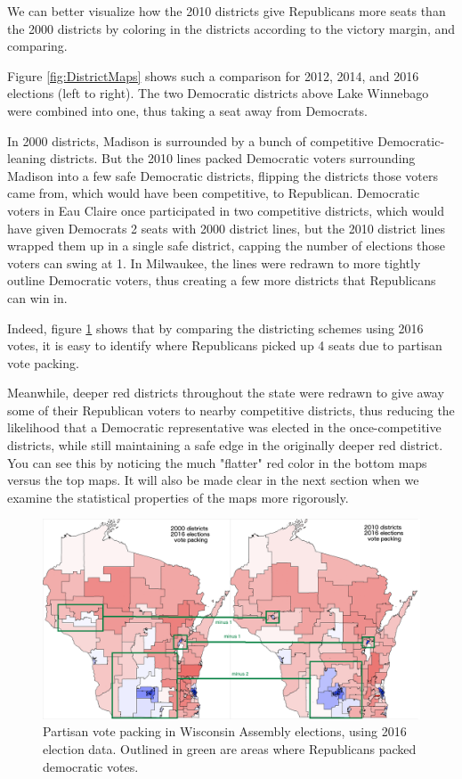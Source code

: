 \documentclass[preprint,12pt]{article}
\begin{document}
We can better visualize how the 2010 districts give Republicans more seats than the 2000 districts by coloring in the districts according to the victory margin, and comparing.

Figure \ref{fig:DistrictMaps} shows such a comparison for 2012, 2014, and 2016 elections (left to right).
The two Democratic districts above Lake Winnebago were combined into one, thus taking a seat away from Democrats.

In 2000 districts, Madison is surrounded by a bunch of competitive Democratic-leaning districts.
But the 2010 lines packed Democratic voters surrounding Madison into a few safe Democratic districts, flipping the districts those voters came from, which would have been competitive, to Republican.
Democratic voters in Eau Claire once participated in two competitive districts, which would have given Democrats 2 seats with 2000 district lines, but the 2010 district lines wrapped them up in a single safe district, capping the number of elections those voters can swing at 1.
In Milwaukee, the lines were redrawn to more tightly outline Democratic voters, thus creating a few more districts that Republicans can win in.

Indeed, figure \ref{fig:DistrictMapDelta} shows that by comparing the districting schemes using 2016 votes, it is easy to identify where Republicans picked up 4 seats due to partisan vote packing.

Meanwhile, deeper red districts throughout the state were redrawn to give away some of their Republican voters to nearby competitive districts,
thus reducing the likelihood that a Democratic representative was elected in the once-competitive districts,
while still maintaining a safe edge in the originally deeper red district.  
You can see this by noticing the much "flatter" red color in the bottom maps versus the top maps.
It will also be made clear in the next section when we examine the statistical properties of the maps more rigorously.

\begin{figure}[htb!]
    \begin{center}
        \includegraphics[scale=0.25]{../Figures/WI_compared/districts_compared_deltas.png}
        \caption{Partisan vote packing in Wisconsin Assembly elections, using 2016 election data.  Outlined in green are areas where Republicans packed democratic votes.}\label{fig:DistrictMapDelta}
    \end{center}
\end{figure}
\end{document}
